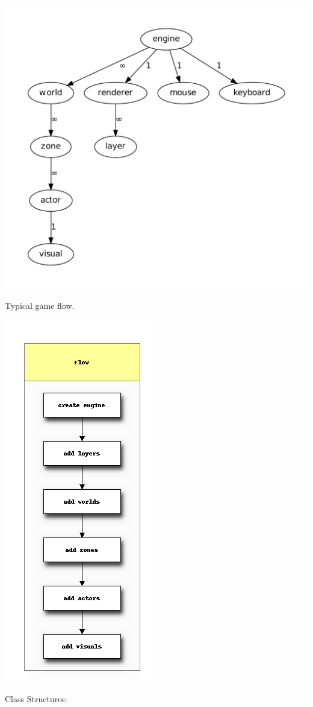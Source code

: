 \documentclass[letterpaper,10pt,english]{sphinxmanual}
\begin{document}
\includegraphics{graphviz-e2e822b8a37c9284baaff76adbf1821ec6eb1438.pdf}

Typical game flow.
\par\includegraphics{actdiag-fc87f097c5ab00ddb68ee1091b95b8b7d891992a.png}\par
Class Structures:
\end{document}
